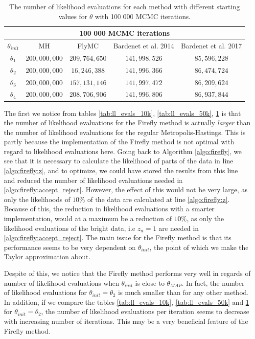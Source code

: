  \begin{table}
    \centering
\begin{tabular}{|c|c|c|c|c|}
  \hline
    \multicolumn{5}{|c|}{100 000 MCMC iterations} \\
    \hline
\hline
        $\theta_{init}$ &  MH & FlyMC & Bardenet et al. 2014 & Bardenet et al. 2017\\ 
         \hline \hline$\theta_1$ & $200,000,000$ & $209,764,650$ & $141,998,526$ & $85,596,228$ \\
        $\theta_2$ & $200,000,000$ & $16,246,388$ & $141,996,366$ & $86,474,724$ \\
        $ \theta_3$ & $200,000,000$ & $157,131,146$ & $141,997,472$ & $86,209,624$ \\
        $\theta_4$ & $200,000,000$ & $208,706,906$ & $141,996,806$ & $86,937,844$
        \\ \hline
\end{tabular}
\caption{The number of likelihood evaluations for each method with different starting values for $\theta$ with 100 000 MCMC iterations.}
\label{tab:ll_evals_100k}
\end{table} 
The first we notice from tables \ref{tab:ll_evals_10k}, \ref{tab:ll_evals_50k}, \ref{tab:ll_evals_100k} is that the number of likelihood evaluations for the Firefly method is actually \textit{larger} than the number of likelihood evaluations for the regular Metropolis-Hastings. This is partly because the implementation of the Firefly method is not optimal with regard to likelihood evaluations here. Going back to Algorithm \ref{algo:firefly}, we see that it is necessary to calculate the likelihood of parts of the data in line \ref{algo:firefly:z}, and to optimize, we could have stored the results from this line and reduced the number of likelihood evaluations needed in \ref{algo:firefly:accept_reject}. However, the effect of this would not be very large, as only the likelihoods of $10\%$ of the data are calculated at line \ref{algo:firefly:z}. Because of this, the reduction in likelihood evaluations with a smarter implementation, would at a maximum be a reduction of $10\%$, as only the likelihood evaluations of the bright data, i.e $z_n = 1$ are needed in \ref{algo:firefly:accept_reject}. The main issue for the Firefly method is that its performance seems to be very dependent on $\theta_{init}$, the point of which we make the Taylor approximation about.  

Despite of this, we notice that the Firefly method performs very well in regards of number of likelihood evaluations when $\theta_{init}$ is close to $\theta_{MAP}$. In fact, the number of likelihood evaluations for $\theta_{init} = \theta_2$ is much smaller than for any other method. In addition, if we compare the tables \ref{tab:ll_evals_10k}, \ref{tab:ll_evals_50k} and \ref{tab:ll_evals_100k} for $\theta_{init} = \theta_2$, the number of likelihood evaluations per iteration seems to decrease with increasing number of iterations. This may be a very beneficial feature of the Firefly method. 

